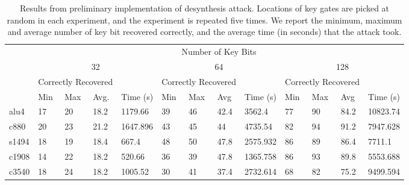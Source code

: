 \begin{table}[]
\centering
\caption{Results from preliminary implementation of desynthesis attack. Locations of key gates are 
picked at random in each experiment, and the experiment is repeated five times. We report the minimum, maximum and average number of key bit recovered correctly, and the average time (in seconds) that the attack took.}
\label{my-label}
\begin{tabular}{|l|l|l|l|l|l|l|l|l|l|l|l|l|}
\hline
\multirow{4}{*}{} & \multicolumn{12}{c|}{Number of Key Bits}                                                                                                                        \\ \cline{2-13} 
                  & \multicolumn{4}{c|}{32}                             & \multicolumn{4}{c|}{64}                             & \multicolumn{4}{c|}{128}                            \\ \cline{2-13} 
                  & \multicolumn{3}{l|}{Correctly Recovered} &          & \multicolumn{3}{l|}{Correctly Recovered} &          & \multicolumn{3}{l|}{Correctly Recovered} &          \\ \cline{2-13} 
                  & Min         & Max         & Avg.         & Time (s) & Min         & Max         & Avg          & Time (s) & Min         & Max         & Avg          & Time (s) \\ \hline
alu4              & 17          & 20          & 18.2         &     1179.66     & 39          & 46          & 42.4         &      3562.4    & 77          & 90          & 84.2         &    10823.74      \\ \hline
c880              & 20          & 23          & 21.2         &      1647.896    & 43          & 45          & 44           &    4735.54      & 82          & 94          & 91.2         &    7947.628      \\ \hline
s1494             & 18          & 19          & 18.4         &      667.4    & 48          & 50          & 47.8         &    2575.932      & 86          & 89          & 86.4         & 7711.1         \\ \hline
c1908             & 14          & 22          & 18.2         &      520.66    & 36          & 39          & 47.8         &    1365.758     & 86          & 93          & 89.8         & 5553.688         \\ \hline
c3540             & 18          & 24          & 18.2         &      1005.52    & 30          & 41          & 37.4         &    2732.614     & 68          & 82          & 75.2         & 9499.594         \\ \hline
\end{tabular}
\end{table}


